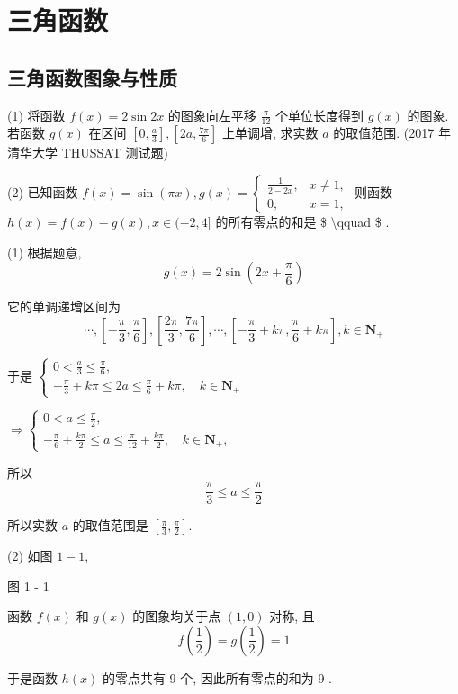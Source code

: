 \chapter{三角函数}
\section{三角函数图象与性质}
\begin{example}
	(1) 将函数 $f(x)=2 \sin 2 x$ 的图象向左平移 $\frac{\pi}{12}$ 个单位长度得到 $g(x)$ 的图象. 若函数 $g(x)$ 在区间 $\left[0, \frac{a}{3}\right],\left[2 a, \frac{7 \pi}{6}\right]$ 上单调增, 求实数 $a$ 的取值范围. (2017 年清华大学 THUSSAT 测试题)

	(2) 已知函数 $f(x)=\sin (\pi x), g(x)=\left\{\begin{array}{ll}\frac{1}{2-2 x}, & x \neq 1, \\ 0, & x=1,\end{array}\right.$ 则函数 $h(x)=f(x)-g(x), x \in(-2,4]$ 的所有零点的和是 \$ \textbackslash qquad \$ .
\end{example}

\begin{solution}
	(1) 根据题意,
	$$
		g(x)=2 \sin \left(2 x+\frac{\pi}{6}\right)
	$$

	它的单调递增区间为
	$$
		\cdots,\left[-\frac{\pi}{3}, \frac{\pi}{6}\right],\left[\frac{2 \pi}{3}, \frac{7 \pi}{6}\right], \cdots,\left[-\frac{\pi}{3}+k \pi, \frac{\pi}{6}+k \pi\right], k \in \mathbf{N}_{+}
	$$

	于是 $\left\{\begin{array}{l}0<\frac{a}{3} \leqslant \frac{\pi}{6}, \\ -\frac{\pi}{3}+k \pi \leqslant 2 a \leqslant \frac{\pi}{6}+k \pi, \quad k \in \mathbf{N}_{+}\end{array}\right. $
    
    $\Rightarrow\left\{\begin{array}{l}0<a \leqslant \frac{\pi}{2}, \\ -\frac{\pi}{6}+\frac{k \pi}{2} \leqslant a \leqslant \frac{\pi}{12}+\frac{k \pi}{2}, \quad k \in \mathbf{N}_{+},\end{array}\right.$

	所以
	$$
		\frac{\pi}{3} \leqslant a \leqslant \frac{\pi}{2}
	$$

	所以实数 $a$ 的取值范围是 $\left[\frac{\pi}{3}, \frac{\pi}{2}\right]$.

	(2) 如图 $1-1$,

	图 1 - 1

	函数 $f(x)$ 和 $g(x)$ 的图象均关于点 $(1,0)$ 对称, 且
	$$
		f\left(\frac{1}{2}\right)=g\left(\frac{1}{2}\right)=1
	$$

	于是函数 $h(x)$ 的零点共有 9 个, 因此所有零点的和为 9 .
\end{solution}


